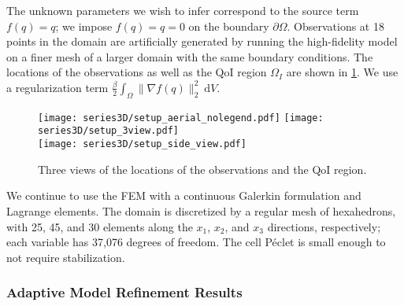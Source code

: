 The unknown parameters we wish to infer correspond to the source term $f(q)=q$; we impose $f(q)=q=0$ on the boundary $\partial\Omega$. Observations at 18 points in the domain are artificially generated by running the high-fidelity model on a finer mesh of a larger domain with the same boundary conditions. The locations of the observations as well as the QoI region $\Omega_I$ are shown in \cref{fig:setup3D}. We use a regularization term $\frac{\beta}{2}\int_\Omega \|\nabla f(q)\|_2^2\:\textrm{d}V$.
%
\begin{figure}[htbp]
\centering
\texttt{[image: series3D/setup\_aerial\_nolegend.pdf]} \hfill
\texttt{[image: series3D/setup\_3view.pdf]} \\ 
\vspace{\baselineskip}
\texttt{[image: series3D/setup\_side\_view.pdf]}
\caption{Three views of the locations of the observations and the QoI region.}
\label{fig:setup3D}
\end{figure}
%
We continue to use the FEM with a continuous Galerkin formulation and Lagrange elements. The domain is discretized by a regular mesh of hexahedrons, with 25, 45, and 30 elements along the $x_1$, $x_2$, and $x_3$ directions, respectively; each variable has 37,076 degrees of freedom. The cell P\'{e}clet is small enough to not require stabilization.

\subsubsection{Adaptive Model Refinement Results} \label{sec:ref3D}

